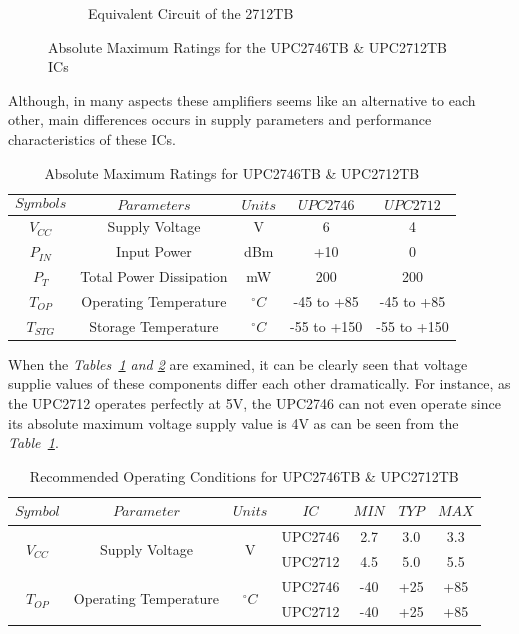 \begin{figure}[H]
\begin{subfigure}{.5\textwidth}
  		\caption{\label{fig:2712cct}Equivalent Circuit of the 2712TB}
	\end{subfigure}
\caption{\label{fig:274612cct} Absolute Maximum Ratings for the UPC2746TB \& UPC2712TB ICs   }
\end{figure}	


	Although, in many aspects these amplifiers seems like an alternative to each other, main differences occurs in supply parameters and performance characteristics of these ICs.
	
\begin{table}[H]
  \centering
 
    \begin{tabular}{c|c|c|c|c}
       $$Symbols$$ & $$Parameters$$ & $$Units$$  & $$UPC2746$$  & $$UPC2712$$ \\ \hline
       $V_{CC}$ & Supply Voltage & V & 6 &  4 \\ \hline
       $P_{IN}$ & Input Power & dBm &  +10 &  0 \\ \hline
       $P_T$ & Total Power Dissipation & mW & 200 & 200 \\ \hline
       $T_{OP}$ & Operating Temperature & $^{\circ}C$ & -45 to +85  & -45 to +85 \\ \hline
       $T_{STG}$ & Storage Temperature &  $^{\circ}C$ & -55 to +150 & -55 to +150 
 	\end{tabular}
  \caption{Absolute Maximum Ratings for UPC2746TB \& UPC2712TB}
  \label{tab:absmax}
\end{table}
	
	When the \textit{Tables~\ref{tab:absmax} and \ref{tab:reccomb} } are examined, it can be clearly seen that voltage supplie values of these components differ each other dramatically. For instance, as the UPC2712 operates perfectly at 5V, the UPC2746 can not even operate since its absolute maximum voltage supply value is 4V as can be seen from the \textit{Table~\ref{tab:absmax}}.  	
	
	
\begin{table}[H]
  \centering	
	\begin{tabular}{c|c|c|c|c|c|c}
       $Symbol$ & $$Parameter$$ & $$Units$$ & $$IC$$ & $$MIN$$ & $$TYP$$ & $$MAX$$ \\ \hline
       \multirow{2}{*}{$V_{CC}$} & \multirow{2}{*}{Supply Voltage} & \multirow{2}{*}{V} & UPC2746 & 2.7 & 3.0 & 3.3  
       \\ \cline{4-7}  & & & UPC2712 & 4.5 & 5.0 &  5.5  \\ \hline
       \multirow{2}{*}{$T_{OP}$} & \multirow{2}{*}{Operating Temperature} & \multirow{2}{*}{$^{\circ}C$} & UPC2746 & -40 & +25 & +85  
       \\ \cline{4-7}  & & & UPC2712 & -40 & +25 & +85 
       \end{tabular}
       \caption{Recommended Operating Conditions for UPC2746TB \& UPC2712TB}
  \label{tab:reccomb}
\end{table}

